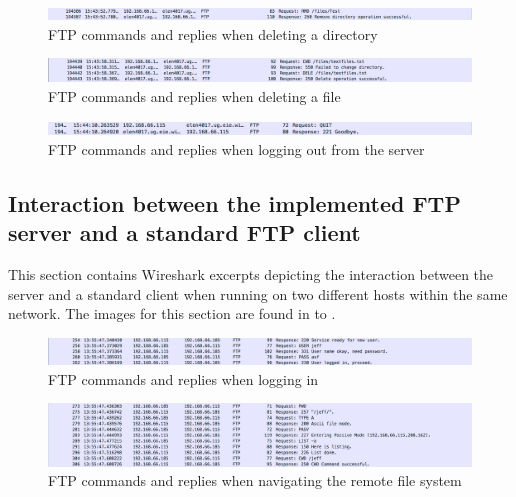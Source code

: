 \documentclass[10pt,twocolumn]{witseiepaper}
\begin{document}
\begin{appendix}
\begin{figure}[h]
	\centering
	\includegraphics[width=1\textwidth]{deleteDirWits.png}
	\caption{FTP commands and replies when deleting a directory}
	\raggedright
	\label{fig:deleteDirWits}	
\end{figure}

\begin{figure}[h]
	\centering
	\includegraphics[width=1\textwidth]{deleteFileWits.png}
	\caption{FTP commands and replies when deleting a file}
	\raggedright
	\label{fig:deleteFileWits}	
\end{figure}

\begin{figure}[h]
	\centering
	\includegraphics[width=1\textwidth]{logoutWits.png}
	\caption{FTP commands and replies when logging out from the server}
	\raggedright
	\label{fig:logoutWits}	
\end{figure}

\subsection{Interaction between the implemented FTP server and a standard FTP client} \label{sec:ourserverstandardclient}
This section contains Wireshark excerpts depicting the interaction between the server and a standard client when running on two different hosts within the same network. The images for this section are found in  to .

\begin{figure}[h]
	\centering
	\includegraphics[width=1\textwidth]{theirclientLogin.png}
	\caption{FTP commands and replies when logging in}
	\raggedright
	\label{fig:loginclient}	
\end{figure}

\begin{figure}[h]
	\centering
	\includegraphics[width=1\textwidth]{theirclientnavigate.png}
	\caption{FTP commands and replies when navigating the remote file system}
	\raggedright
	\label{fig:navigateclient}	
\end{figure}



\end{appendix}
\end{document}
